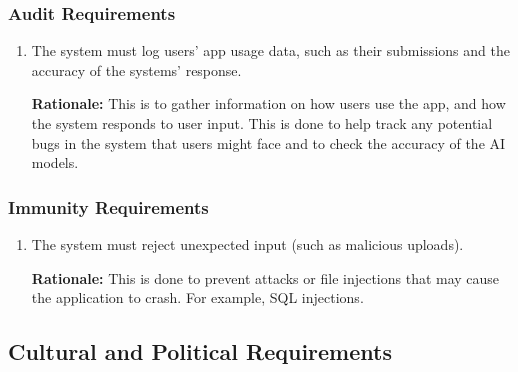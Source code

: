 \documentclass[]{article}
\begin{document}
\subsubsection{Audit Requirements}
\label{ssub:audit_requirements}
\begin{enumerate}[{SR-AU}1. ]
	\item The system must log users’ app usage data, such as their submissions and the accuracy of the systems’ response. 
    
    {\bf Rationale:} This is to gather information on how users use the app, and how the system responds to user input. This is done to help track any potential bugs in the system that users might face and to check the accuracy of the AI models.
\end{enumerate}

\subsubsection{Immunity Requirements}
\label{ssub:immunity_requirements}
\begin{enumerate}[{SR-IM}1. ]
	\item The system must reject unexpected input (such as malicious uploads). 

    {\bf Rationale:} This is done to prevent attacks or file injections that may cause the application to crash. For example, SQL injections.
\end{enumerate}


\subsection{Cultural and Political Requirements}
\label{sub:cultural_and_political_requirements}
\end{document}
